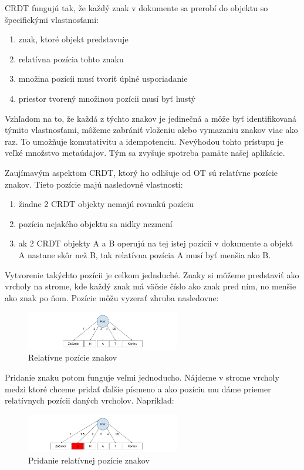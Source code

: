 CRDT fungujú tak, že každý znak v dokumente sa prerobí do objektu so špecifickými vlastnosťami:
\begin{enumerate}
\label{def_pozicie}
  \item znak, ktoré objekt predstavuje
  \item relatívna pozícia tohto znaku
  \item množina pozícíi musí tvoriť úplné usporiadanie
  \item priestor tvorený množinou pozícii musí byť hustý
\end{enumerate}
Vzhľadom na to, že každá z týchto znakov je jedinečná a môže byť identifikovaná
týmito vlastnosťami, môžeme zabrániť vloženiu alebo vymazaniu znakov viac ako raz.
To umožňuje komutativitu a idempotenciu. Nevýhodou tohto prístupu je veľké množstvo metaúdajov.
Tým sa zvyšuje spotreba pamäte našej aplikácie.

Zaujímavým aspektom CRDT, ktorý ho odlišuje od OT sú relatívne pozície znakov. Tieto pozície majú
nasledovné vlastnosti:
\begin{enumerate}
  \item žiadne 2 CRDT objekty nemajú rovnakú pozíciu
  \item pozícia nejakého objektu sa nidky nezmení
  \item ak 2 CRDT objekty A a B operujú na tej istej pozícii v dokumente a objekt A
  nastane skôr než B, tak relatívna pozícia A musí byť menšia ako B.
\end{enumerate}
Vytvorenie takýchto pozícii je celkom jednduché.
Znaky si môžeme predstaviť ako vrcholy na strome, kde každý znak má väčsie číslo ako znak pred
ním, no menšie ako znak po ňom. Pozície môžu vyzerať zhruba nasledovne:

\begin{figure}[H]
\centerline{\includegraphics[width=0.6\textwidth]{images/relativne_pozicie1}}
\caption[Relatívne pozície znakov]{Relatívne pozície znakov}
\label{obr:relativne}
\end{figure}

Pridanie znaku potom funguje veľmi jednoducho. Nájdeme v strome vrcholy medzi ktoré
chceme pridať ďalšie písmeno a ako pozíciu mu dáme priemer relatívnych pozícii daných
vrcholov. Napríklad:
\begin{figure}[H]
\centerline{\includegraphics[width=0.6\textwidth]{images/relativne_pozicie2}}
\caption[Pridanie relatívnej pozície znakov]{Pridanie relatívnej pozície znakov}
\label{obr:relativne_pridanie}
\end{figure}

